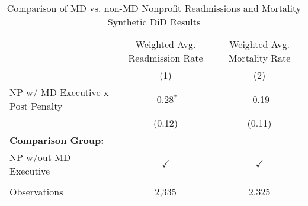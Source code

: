 \begin{table}[ht!]

\caption{Comparison of MD vs. non-MD Nonprofit Readmissions and Mortality Synthetic DiD Results}
\centering
\begin{tabular}[t]{lcc}
\toprule
\multicolumn{1}{c}{ } & \multicolumn{1}{c}{Weighted Avg. Readmission Rate} & \multicolumn{1}{c}{Weighted Avg. Mortality Rate} \\
 & (1) & (2)\\
\midrule
NP w/ MD Executive x Post Penalty & -0.28$^{*}$ & -0.19\\
 & (0.12) & (0.11)\\
\textbf{Comparison Group:} &  & \\
NP w/out MD Executive & $\checkmark$ & $\checkmark$\\
\\
Observations & 2,335 & 2,325\\
\bottomrule
\end{tabular}
\end{table}